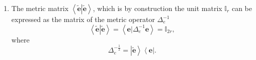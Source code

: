 \documentclass[aps,preprint]{revtex4}%
\begin{document}
\begin{enumerate}
\begin{align}
\left.  \mathbf{f}\right\vert \mathbf{f}\right\rangle ^{\frac{1}{2}%
}\left\langle \left.  \mathbf{e}\right\vert \mathbf{e}\right\rangle
^{-1}\left\langle \left.  \mathbf{e}\right\vert \mathbf{e}\right\rangle
^{\frac{1}{2}}\left\langle \widetilde{\mathbf{e}}\right\vert =\left\vert
\widetilde{\mathbf{f}}\right\rangle \left\langle \left.  \mathbf{f}\right\vert
\mathbf{f}\right\rangle ^{\frac{1}{2}}\left\langle \left.  \mathbf{e}%
\right\vert \mathbf{e}\right\rangle ^{-\frac{1}{2}}\left\langle
\widetilde{\mathbf{e}}\right\vert \\
&  =\sum_{1\leq j\leq r}\left\vert \widetilde{f_{j}}\right\rangle \left\langle
\left.  f_{j}\right\vert f_{j}\right\rangle ^{\frac{1}{2}}\left\langle \left.
e_{j}\right\vert e_{j}\right\rangle ^{-\frac{1}{2}}\left\langle
\widetilde{e_{j}}\right\vert =\sum_{1\leq j\leq r}\left\vert \widetilde{f_{j}%
}\right\rangle \sigma\left(  T_{fe}\right)  _{j}\left\langle \widetilde{e_{j}%
}\right\vert
\end{align}
and%
\begin{align}
T_{fe}^{-1}  &  =\left\vert \mathbf{e}\right\rangle \left\langle \left.
\mathbf{f}\right\vert \mathbf{f}\right\rangle ^{-1}\left\langle \mathbf{f}%
\right\vert =\left\vert \widetilde{\mathbf{e}}\right\rangle \left\langle
\left.  \mathbf{e}\right\vert \mathbf{e}\right\rangle ^{\frac{1}{2}%
}\left\langle \left.  \mathbf{f}\right\vert \mathbf{f}\right\rangle
^{-1}\left\langle \left.  \mathbf{f}\right\vert \mathbf{f}\right\rangle
^{\frac{1}{2}}\left\langle \widetilde{\mathbf{f}}\right\vert =\left\vert
\widetilde{\mathbf{e}}\right\rangle \left\langle \left.  \mathbf{e}\right\vert
\mathbf{e}\right\rangle ^{\frac{1}{2}}\left\langle \left.  \mathbf{f}%
\right\vert \mathbf{f}\right\rangle ^{-\frac{1}{2}}\left\langle
\widetilde{\mathbf{f}}\right\vert \\
&  =\sum_{1\leq j\leq r}\left\vert \widetilde{e_{j}}\right\rangle \left\langle
\left.  e_{j}\right\vert e_{j}\right\rangle ^{\frac{1}{2}}\left\langle \left.
f_{j}\right\vert f_{j}\right\rangle ^{-\frac{1}{2}}\left\langle
\widetilde{f_{j}}\right\vert =\sum_{1\leq j\leq r}\left\vert \widetilde{f_{j}%
}\right\rangle \sigma\left(  T_{fe}^{-1}\right)  _{j}\left\langle
\widetilde{e_{j}}\right\vert .
\end{align}


\item The metric matrix $\left\langle \left.  \widetilde{\mathbf{e}%
}\right\vert \widetilde{\mathbf{e}}\right\rangle $, which is by construction
the unit matrix $\mathbb{I}_{r}$ can be expressed as the matrix of the metric
operator $\Delta_{e}^{-1}$
\begin{equation}
\left\langle \left.  \widetilde{\mathbf{e}}\right\vert \widetilde{\mathbf{e}%
}\right\rangle =\left\langle \left.  \overset{}{\mathbf{e}}\right\vert
\Delta_{e}^{-1}\mathbf{e}\right\rangle =\mathbb{I}_{2r},
\end{equation}
where
\begin{equation}
\Delta_{e}^{-\frac{1}{2}}=\left\vert \widetilde{\mathbf{e}}\right\rangle
\left\langle \mathbf{e}\right\vert .
\end{equation}



\end{enumerate}
\end{document}
